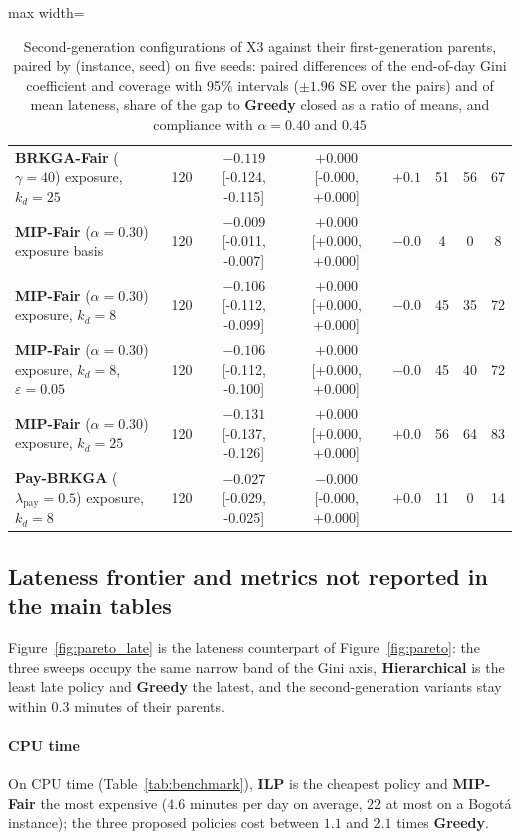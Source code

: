 \documentclass[a4paper,11pt,review,3p,authoryear]{elsarticle}
\begin{document}
\begin{table}
\begin{adjustbox}{max width=\textheight}
\begin{tabular}{l|c|c|c|c|c|cc}
\textbf{BRKGA-Fair} ($\gamma = 40$) exposure, $k_d = 25$ & 120 & $-0.119$ [-0.124, -0.115] & $+0.000$ [-0.000, +0.000] & $+0.1$ & 51 & 56 & 67 \\
\textbf{MIP-Fair} ($\alpha = 0.30$) exposure basis & 120 & $-0.009$ [-0.011, -0.007] & $+0.000$ [+0.000, +0.000] & $-0.0$ & 4 & 0 & 8 \\
\textbf{MIP-Fair} ($\alpha = 0.30$) exposure, $k_d = 8$ & 120 & $-0.106$ [-0.112, -0.099] & $+0.000$ [+0.000, +0.000] & $-0.0$ & 45 & 35 & 72 \\
\textbf{MIP-Fair} ($\alpha = 0.30$) exposure, $k_d = 8$, $\varepsilon = 0.05$ & 120 & $-0.106$ [-0.112, -0.100] & $+0.000$ [+0.000, +0.000] & $-0.0$ & 45 & 40 & 72 \\
\textbf{MIP-Fair} ($\alpha = 0.30$) exposure, $k_d = 25$ & 120 & $-0.131$ [-0.137, -0.126] & $+0.000$ [+0.000, +0.000] & $+0.0$ & 56 & 64 & 83 \\
\textbf{Pay-BRKGA} ($\lambda_{\text{pay}} = 0.5$) exposure, $k_d = 8$ & 120 & $-0.027$ [-0.029, -0.025] & $-0.000$ [-0.000, +0.000] & $+0.0$ & 11 & 0 & 14 \\
\hline
\end{tabular}
\end{adjustbox}
\caption{Second-generation configurations of X3 against their first-generation parents, paired by (instance, seed) on five seeds: paired differences of the end-of-day Gini coefficient and coverage with 95\% intervals ($\pm 1.96$ SE over the pairs) and of mean lateness, share of the gap to \textbf{Greedy} closed as a ratio of means, and compliance with $\alpha = 0.40$ and $0.45$}
\label{tab:gen2_paired}
\end{table}

\subsection{Lateness frontier and metrics not reported in the main tables}
\label{sec:App_metrics}

Figure~\ref{fig:pareto_late} is the lateness counterpart of Figure~\ref{fig:pareto}: the three sweeps occupy the same narrow band of the Gini axis, \textbf{Hierarchical} is the least late policy and \textbf{Greedy} the latest, and the second-generation variants stay within $0.3$ minutes of their parents.

\paragraph{CPU time} On CPU time (Table~\ref{tab:benchmark}), \textbf{ILP} is the cheapest policy and \textbf{MIP-Fair} the most expensive ($4.6$ minutes per day on average, $22$ at most on a Bogot\'a instance); the three proposed policies cost between $1.1$ and $2.1$ times \textbf{Greedy}.
\end{document}
